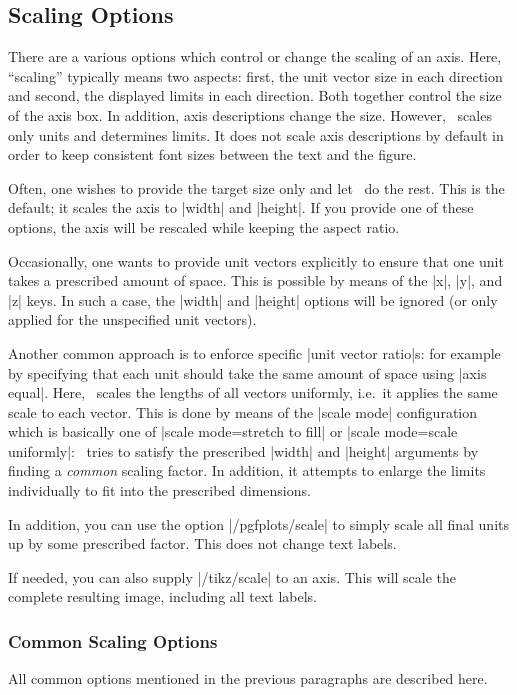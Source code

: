 
\subsection{Scaling Options}
There are a various options which control or change the scaling of an axis. Here, ``scaling'' typically means two aspects: first, the unit vector size in each direction and second, the displayed limits in each direction. Both together control the size of the axis box. In addition, axis descriptions change the size. However, \PGFPlots\ scales only units and determines limits. It does not scale axis descriptions by default in order to keep consistent font sizes between the text and the figure.

Often, one wishes to provide the target size only and let \PGFPlots\ do the rest. This is the default; it scales the axis to |width| and |height|. If you provide one of these options, the axis will be rescaled while keeping the aspect ratio. 

Occasionally, one wants to provide unit vectors explicitly to ensure that one unit takes a prescribed amount of space. This is possible by means of the |x|, |y|, and |z| keys. In such a case, the |width| and |height| options will be ignored (or only applied for the unspecified unit vectors).

Another common approach is to enforce specific |unit vector ratio|s: for example by specifying that each unit should take the same amount of space using |axis equal|. Here, \PGFPlots\ scales the lengths of all vectors uniformly, i.e.\ it applies the same scale to each vector. This is done by means of the |scale mode| configuration which is basically one of |scale mode=stretch to fill| or |scale mode=scale uniformly|: \PGFPlots\ tries to satisfy the prescribed |width| and |height| arguments by finding a \emph{common} scaling factor. In addition, it attempts to enlarge the limits individually to fit into the prescribed dimensions.

In addition, you can use the option |/pgfplots/scale| to simply scale all final units up by some prescribed factor. This does not change text labels. 

If needed, you can also supply |/tikz/scale| to an axis. This will scale the complete resulting image, including all text labels.

\subsubsection{Common Scaling Options}
All common options mentioned in the previous paragraphs are described here.

